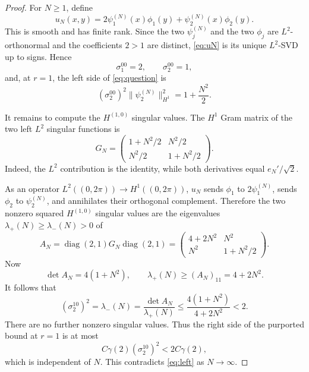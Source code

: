 \documentclass[11pt]{article}
\newcommand{\T}{(0,2\pi)}
\begin{document}
\begin{proof}
For $N\geq1$, define
\begin{equation}\label{eq:uN}
 u_N(x,y)=2\psi_1^{(N)}(x)\phi_1(y)
          +\psi_2^{(N)}(x)\phi_2(y).
\end{equation}
This is smooth and has finite rank.  Since the two $\psi_j^{(N)}$ and the two
$\phi_j$ are $L^2$-orthonormal and the coefficients $2>1$ are distinct,
\eqref{eq:uN} is its unique $L^2$-SVD up to signs.  Hence
\[
 \sigma_1^{00}=2,\qquad \sigma_2^{00}=1,
\]
and, at $r=1$, the left side of \eqref{eq:question} is
\begin{equation}\label{eq:left}
 (\sigma_2^{00})^2\|\psi_2^{(N)}\|_{H^1}^2
 =1+\frac{N^2}{2}.
\end{equation}

It remains to compute the $H^{(1,0)}$ singular values.  The $H^1$ Gram
matrix of the two left $L^2$ singular functions is
\begin{equation}\label{eq:gram}
 G_N=
 \begin{pmatrix}
  1+N^2/2&N^2/2\\
  N^2/2&1+N^2/2
 \end{pmatrix}.
\end{equation}
Indeed, the $L^2$ contribution is the identity, while both derivatives equal
$e_N'/\sqrt2$.

As an operator $L^2(\T)\to H^1(\T)$, $u_N$ sends $\phi_1$ to
$2\psi_1^{(N)}$, sends $\phi_2$ to $\psi_2^{(N)}$, and annihilates their
orthogonal complement.  Therefore the two nonzero squared
$H^{(1,0)}$ singular values are the eigenvalues
$\lambda_+(N)\geq\lambda_-(N)>0$ of
\begin{equation}\label{eq:AN}
 A_N=\operatorname{diag}(2,1)G_N\operatorname{diag}(2,1)
 =\begin{pmatrix}
   4+2N^2&N^2\\
   N^2&1+N^2/2
  \end{pmatrix}.
\end{equation}
Now
\[
 \det A_N=4(1+N^2),
 \qquad
 \lambda_+(N)\geq (A_N)_{11}=4+2N^2.
\]
It follows that
\begin{equation}\label{eq:small}
 (\sigma_2^{10})^2=\lambda_-(N)
 =\frac{\det A_N}{\lambda_+(N)}
 \leq\frac{4(1+N^2)}{4+2N^2}<2.
\end{equation}
There are no further nonzero singular values.  Thus the right side of the
purported bound at $r=1$ is at most
\[
 C\gamma(2)(\sigma_2^{10})^2<2C\gamma(2),
\]
which is independent of $N$.  This contradicts \eqref{eq:left} as
$N\to\infty$.
\end{proof}
\end{document}
